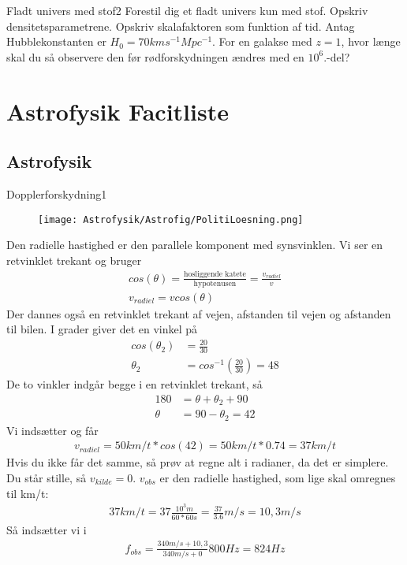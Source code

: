 \begin{opgave}{Fladt univers med stof}{2}
	Forestil dig et fladt univers kun med stof.
	\opg Opskriv densitetsparametrene.
	\opg Opskriv skalafaktoren som funktion af tid.
	\opg Antag Hubblekonstanten er $H_0=70 km s^{-1} Mpc^{-1}$. For en galakse med $z=1$, hvor længe skal du så observere den før rødforskydningen ændres med en $10^6$.-del?
\end{opgave}

\chapter{Astrofysik Facitliste}
\section*{Astrofysik}
\begin{opgave}{Dopplerforskydning}{1}
	\opg 
	\begin{figure}[h!]
		\centering
		\texttt{[image: Astrofysik/Astrofig/PolitiLoesning.png]}
	\end{figure}
	\opg Den radielle hastighed er den parallele komponent med synsvinklen. Vi ser en retvinklet trekant og bruger
	\begin{align}
		cos(\theta)=\frac{\text{hosliggende katete}}{\text{hypotenusen}}=\frac{v_{radiel}}{v} \\
		v_{radiel}=v cos(\theta)
	\end{align}
	Der dannes også en retvinklet trekant af vejen, afstanden til vejen og afstanden til bilen. I grader giver det en vinkel på
	\begin{align}
		cos(\theta_2)&=\frac{20}{30}\\
		\theta_2 &= cos^{-1} \left( \frac{20}{30} \right) = 48
	\end{align}
	De to vinkler indgår begge i en retvinklet trekant, så
	\begin{align}
		180 &= \theta + \theta_2 + 90\\
		\theta &= 90 - \theta_2  = 42
	\end{align}
	Vi indsætter og får
	\begin{align}
	v_{radiel}=50 km/t * cos(42) = 50 km/t * 0.74 = 37 km/t
	\end{align}
	Hvis du ikke får det samme, så prøv at regne alt i radianer, da det er simplere.
	\opg 
	Du står stille, så $v_{kilde}=0$. $v_{obs}$ er den radielle hastighed, som lige skal omregnes til km/t:
	\begin{align}
	37 km/t = 37 \frac{10^{3}m}{60*60 s} = \frac{37}{3.6} m/s = 10,3 m/s
	\end{align}
	Så indsætter vi i
	\begin{align}
	f_{obs} = \frac{340 m/s + 10,3}{340 m/s + 0} 800 Hz = 824 Hz
	\end{align}
\end{opgave}

